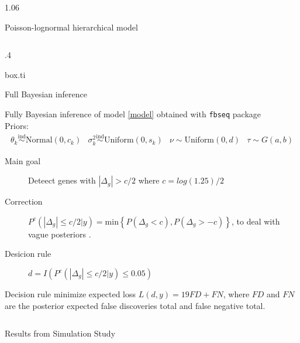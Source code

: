 \documentclass[final]{beamer}
\newlength{\onecolwid}
\newlength{\twocolwid}
\newlength{\threecolwid}
\begin{document}
\begin{frame}
\begin{columns}[t,totalwidth=\threecolwid]
\begin{column}{1.06\twocolwid}
\begin{alertblock}{Poisson-lognormal hierarchical model}
\begin{columns}[t, totalwidth = \twocolwid]
\begin{column}{.4\twocolwid}
\begin{beamercolorbox}{box.ti}
\vspace{.05cm}

Full Bayesian inference
\vspace{.05cm}

\end{beamercolorbox}
\vspace{.5cm}
Fully Bayesian inference of model \eqref{model} obtained with {\tt fbseq} package \citep{landau2016}\\
Priors: 
\[ \label{hyp_v1}
\begin{array}{cccc}
\theta_k \stackrel{\text{ind}}{\sim} \text{Normal}(0, c_{k}) &
\sigma_k^2  \stackrel{\text{ind}}{\sim} \text{Uniform}(0, s_{k}) &
\nu   \sim \text{Uniform}(0, d) &
\tau \sim G(a, b)
\end{array} \]
\vspace{.5cm}

\begin{description} 
\item[Main goal] Deteect genes with $|\Delta_g| > c/2$ where $c=log(1.25)/2$ \citep{Lithio2015}
\vspace{.2cm}

\item[Correction] $P^c( |\Delta_g| \leq c/2 \vert y) =  \mbox{min}\left\{ P( \Delta_g < c) , P( \Delta_g > -c) \right\}$, to deal with vague posteriors \citep{VanDeWiel2013}.
\vspace{.2cm}

\item[Desicion rule] $d = I(P^c( |\Delta_g| \leq c/2 \vert y) \leq 0.05)$ 
\end{description}
Decision rule minimize expected loss $L(d,y) = 19FD + FN$, where $FD$ and $FN$ are the posterior expected false discoveries total and false negative total. \citep{Muller2004}
\end{column}
\end{columns}
\end{alertblock} %

\begin{columns}[t, totalwidth = 1.06\twocolwid] 

\begin{column}{\onecolwid}
\begin{alertblock}{Results from Simulation Study}


\end{alertblock}
\end{column}
\end{columns}
\end{column}
\end{columns}
\end{frame}
\end{document}
